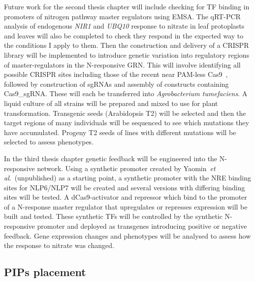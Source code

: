 Future work for the second thesis chapter will include checking for TF binding in promoters of nitrogen pathway master regulators using EMSA.
The qRT\hyp{}PCR analysis of endogenous \textit{NIR1} and \textit{UBQ10} response to nitrate in leaf protoplasts and leaves will also be completed to check they respond in the expected way to the conditions I apply to them.
Then the construction and delivery of a CRISPR library will be implemented to introduce genetic variation into regulatory regions of master\hyp{}regulators in the N\hyp{}responsive GRN.
This will involve identifying all possible CRISPR sites including those of the recent near PAM\hyp{}less Cas9~\autocite{waltonUnconstrainedGenomeTargeting2020}, followed by construction of sgRNAs and assembly of constructs containing Cas9\_sgRNA.
These will each be transferred into \textit{Agrobacterium tumefaciens}.
A liquid culture of all strains will be prepared and mixed to use for plant transformation.
Transgenic seeds (Arabidopsis T2) will be selected and then the target regions of many individuals will be sequenced to see which mutations they have accumulated. Progeny T2 seeds of lines with different mutations will be selected to assess phenotypes.

In the third thesis chapter genetic feedback will be engineered into the N\hyp{}responsive network.
Using a synthetic promoter created by Yaomin~\textit{et al}.~(unpublished) as a starting point, a synthetic promoter with the NRE binding sites for NLP6/NLP7 will be created and several versions with differing binding sites will be tested.
A dCas9\hyp{}activator and repressor which bind to the promoter of a N\hyp{}response master regulator that upregulates or represses expression will be built and tested.
These synthetic TFs will be controlled by the synthetic N\hyp{}responsive promoter and deployed as transgenes introducing positive or negative feedback.
Gene expression changes and phenotypes will be analysed to assess how the response to nitrate was changed.

\subsection{PIPs placement}
\label{pips-placement}

